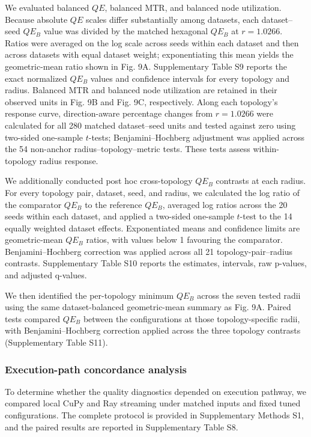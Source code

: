 \documentclass[10pt]{article} %
\begin{document}
We evaluated balanced $QE$, balanced MTR, and balanced node utilization. Because absolute $QE$ scales differ substantially among datasets, each dataset--seed $QE_B$ value was divided by the matched hexagonal $QE_B$ at $r=1.0266$. Ratios were averaged on the log scale across seeds within each dataset and then across datasets with equal dataset weight; exponentiating this mean yields the geometric-mean ratio shown in Fig. 9A. Supplementary Table S9 reports the exact normalized $QE_B$ values and confidence intervals for every topology and radius. Balanced MTR and balanced node utilization are retained in their observed units in Fig. 9B and Fig. 9C, respectively. Along each topology's response curve, direction-aware percentage changes from $r=1.0266$ were calculated for all 280 matched dataset--seed units and tested against zero using two-sided one-sample $t$-tests; Benjamini--Hochberg adjustment was applied across the 54 non-anchor radius--topology--metric tests. These tests assess within-topology radius response.

We additionally conducted post hoc cross-topology $QE_B$ contrasts at each radius. For every topology pair, dataset, seed, and radius, we calculated the log ratio of the comparator $QE_B$ to the reference $QE_B$, averaged log ratios across the 20 seeds within each dataset, and applied a two-sided one-sample $t$-test to the 14 equally weighted dataset effects. Exponentiated means and confidence limits are geometric-mean $QE_B$ ratios, with values below 1 favouring the comparator. Benjamini--Hochberg correction was applied across all 21 topology-pair--radius contrasts. Supplementary Table S10 reports the estimates, intervals, raw p-values, and adjusted q-values.

We then identified the per-topology minimum $QE_B$ across the seven tested radii using the same dataset-balanced geometric-mean summary as Fig. 9A. Paired tests compared $QE_B$ between the configurations at those topology-specific radii, with Benjamini--Hochberg correction applied across the three topology contrasts (Supplementary Table S11).

\subsubsection{Execution-path concordance analysis}

To determine whether the quality diagnostics depended on execution pathway, we compared local CuPy and Ray streaming under matched inputs and fixed tuned configurations. The complete protocol is provided in Supplementary Methods S1, and the paired results are reported in Supplementary Table S8.
\end{document}
